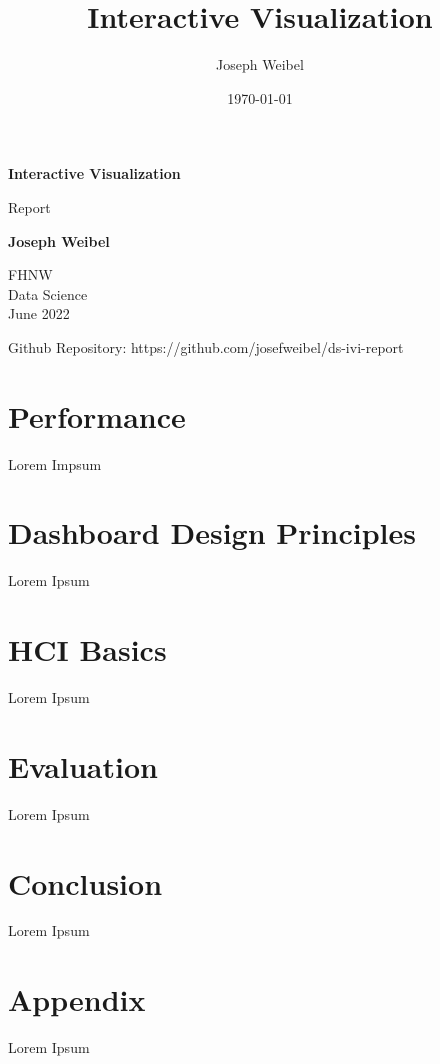 \documentclass[11pt]{article}
\title{Interactive Visualization}
\author{Joseph Weibel}
\date{\today}
\begin{document}
\begin{titlepage}
    \begin{center}
        \vspace*{0.4cm}

        \Huge
        \textbf{Interactive Visualization}

        \vspace{0.3cm}
        \LARGE
        Report

        \vspace{0.8cm}

        \textbf{Joseph Weibel}

        \vfill


        \vfill

        \vspace{0.3cm}

        \Large
        FHNW\\
        Data Science\\
        June 2022

        \vspace{1.0cm}

        \normalsize
        Github Repository: https://github.com/josefweibel/ds-ivi-report

        \vspace{0.8cm}

    \end{center}
\end{titlepage}
\pagebreak

\tableofcontents
\pagebreak


\section{Performance}

Lorem Impsum


\pagebreak
\section{Dashboard Design Principles}
Lorem Ipsum

\pagebreak
\section{HCI Basics}
Lorem Ipsum

\pagebreak
\section{Evaluation}
Lorem Ipsum

\pagebreak
\section{Conclusion}
Lorem Ipsum

\pagebreak
\section{Appendix}
Lorem Ipsum
\end{document}
